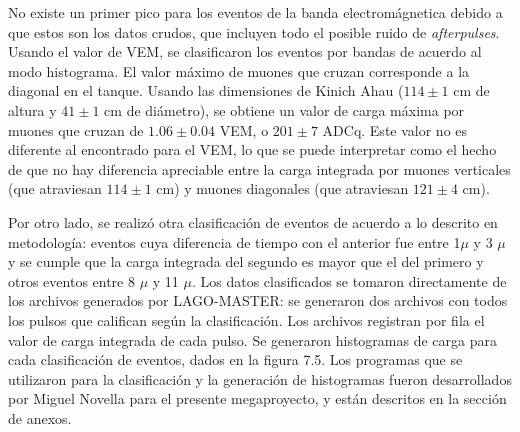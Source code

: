 \documentclass{book}
\begin{document}
No existe un primer pico para los eventos de la banda electrom\'agnetica debido a que estos son los datos crudos, que incluyen todo el posible ruido de \textit{afterpulses}. Usando el valor de VEM, se clasificaron los eventos por bandas de acuerdo al modo histograma. El valor m\'aximo de muones que cruzan corresponde a la diagonal en el tanque. Usando las dimensiones de Kinich Ahau ($114\pm1$ cm de altura y $41\pm1$ cm de di\'ametro), se obtiene un valor de carga m\'axima por muones que cruzan de $1.06\pm0.04$ VEM, o $201\pm7$ ADCq. Este valor no es diferente al encontrado para el VEM, lo que se puede interpretar como el hecho de que no hay diferencia apreciable entre la carga integrada por muones verticales (que atraviesan $114\pm1$ cm) y muones diagonales (que atraviesan $121\pm4$ cm).

Por otro lado, se realiz\'o otra clasificaci\'on de eventos de acuerdo a lo descrito en metodolog\'ia: eventos cuya diferencia de tiempo con el anterior fue entre 1$\mu$ y 3 $\mu$ y se cumple que la carga integrada del segundo es mayor que el del primero y otros eventos entre 8 $\mu$ y 11 $\mu$. Los datos clasificados se tomaron directamente de los archivos generados por LAGO-MASTER: se generaron dos archivos con todos los pulsos que califican seg\'un la clasificaci\'on. Los archivos registran por fila el valor de carga integrada de cada pulso. Se generaron histogramas de carga para cada clasificaci\'on de eventos, dados en la figura 7.5. Los programas que se utilizaron para la clasificaci\'on y la generaci\'on de histogramas fueron desarrollados por Miguel Novella para el presente megaproyecto, y est\'an descritos en la secci\'on de anexos.
\end{document}
